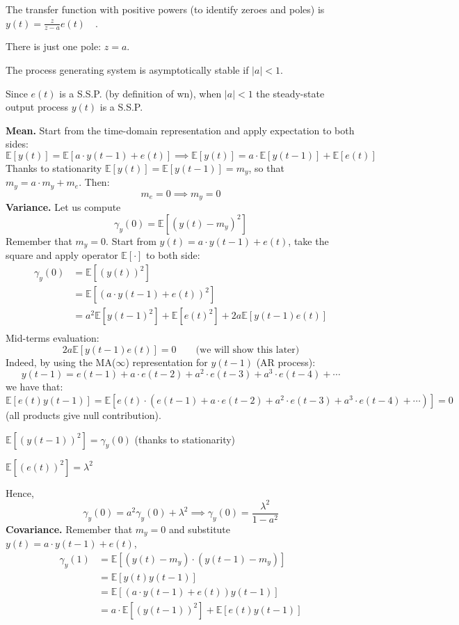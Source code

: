 The transfer function with positive powers (to identify zeroes and poles) is $y(t)=\frac{z}{z-a} e(t) \quad$.

There is just one pole: $z=a .$

The process generating system is asymptotically stable if $|a| <1$. 

Since $e(t)$ is a S.S.P. (by definition of \gls{wn}), when $|a| <1$ the steady-state output process $y(t)$ is a S.S.P.

\textbf{Mean.}
Start from the time-domain representation and apply expectation to both sides:
\[
	\mathbb{E}[y(t)]=\mathbb{E}[a \cdot y(t-1)+e(t)] \implies \mathbb{E}[y(t)]=a \cdot \mathbb{E}[y(t-1)]+\mathbb{E}[e(t)]
\]
Thanks to stationarity $\mathbb{E}[y(t)]=\mathbb{E}[y(t-1)]=m_{y}$, so that $m_{y}=a \cdot m_{y}+m_{e}$.
Then:
$$
m_{e}=0 \implies  m_{y}=0
$$
\textbf{Variance.}
Let us compute
\[
	\gamma_{y}(0)=\mathbb{E}\left[\left(y(t)-m_{y}\right)^{2}\right]
\]
Remember that $m_{y}=0$. Start from $y(t)=a \cdot y(t-1)+e(t)$, take the square and apply operator $\mathbb{E}[\cdot]$ to both side:
\begin{align*}
	\gamma_{y}(0)&=\mathbb{E}\left[(y(t))^{2}\right]\\
	&=\mathbb{E}\left[(a \cdot y(t-1)+e(t))^{2}\right]\\
	&=a^{2} \mathbb{E}\left[y(t-1)^{2}\right]+\mathbb{E}\left[e(t)^{2}\right]+2 a \mathbb{E}[y(t-1) e(t)]\\
\end{align*}
Mid-terms evaluation:
\[
	2 a \mathbb{E}[y(t-1) e(t)]=0 \qquad \text{(we will show this later)}
\]
Indeed, by using the MA($\infty$) representation for $y(t-1)$ (AR process):
$$
y(t-1)=e(t-1)+a \cdot e(t-2)+a^{2} \cdot e(t-3)+a^{3} \cdot e(t-4)+\cdots
$$
we have that:
\[
	\mathbb{E}[e(t) y(t-1)]=\mathbb{E}\left[e(t) \cdot\left(e(t-1)+a \cdot e(t-2)+a^{2} \cdot e(t-3)+a^{3} \cdot e(t-4)+\cdots\right)\right]=0
\]
(all products give null contribution).


$\mathbb{E}\left[(y(t-1))^{2}\right]=\gamma_{y}(0)$ (thanks to stationarity)

$\mathbb{E}\left[(e(t))^{2}\right]=\lambda^{2}$

Hence,
\[
	\gamma_{y}(0)=a^{2} \gamma_{y}(0)+\lambda^{2} \implies \gamma_{y}(0)=\frac{\lambda^{2}}{1-a^{2}}
\]
\textbf{Covariance.}
Remember that $m_{y}=0$ and substitute $y(t)=a \cdot y(t-1)+e(t)$,
\begin{align*}
	\gamma_{y}(1)&=\mathbb{E}\left[\left(y(t)-m_{y}\right) \cdot\left(y(t-1)-m_{y}\right)\right]\\
	&=\mathbb{E}[y(t) y(t-1)]\\
	&=\mathbb{E}[(a \cdot y(t-1)+e(t))y(t-1)]\\
	&=a \cdot \mathbb{E}\left[(y(t-1))^{2}\right]+\mathbb{E}[e(t) y(t-1)]
\end{align*}

